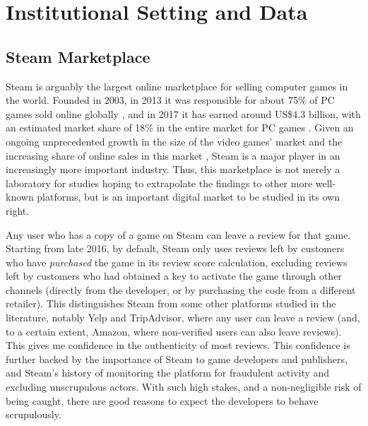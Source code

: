 \documentclass[12pt,pagebackref]{article}
\begin{document}
\hypertarget{institutional-setting-and-data}{%
\section{Institutional Setting and
Data}\label{institutional-setting-and-data}}

\hypertarget{steam-marketplace}{%
\subsection{Steam Marketplace}\label{steam-marketplace}}

Steam is arguably the largest online marketplace for selling computer
games in the world. Founded in 2003, in 2013 it was responsible for
about 75\% of PC games sold online globally \citep{steamBloomberg}, and
in 2017 it has earned around US\$4.3 billion, with an estimated market
share of 18\% in the entire market for PC games \citep{psgames}. Given
an ongoing unprecedented growth in the size of the video games' market
\citep[\$43.4 billion in 2018, about the size of the U.S. film
industry,][]{videoGamesMarket} and the increasing share of online sales
in this market \citep[83\% in 2018, compared to 20\% in
2009,][]{steamNPD}, Steam is a major player in an increasingly more
important industry. Thus, this marketplace is not merely a laboratory
for studies hoping to extrapolate the findings to other more well-known
platforms, but is an important digital market to be studied in its own
right.

Any user who has a copy of a game on Steam can leave a review for that
game. Starting from late 2016, by default, Steam only uses reviews left
by customers who have \emph{purchased} the game in its review score
calculation, excluding reviews left by customers who had obtained a key
to activate the game through other channels (directly from the
developer, or by purchasing the code from a different retailer). This
distinguishes Steam from some other platforms studied in the literature,
notably Yelp and TripAdvisor, where any user can leave a review (and, to
a certain extent, Amazon, where non-verified users can also leave
reviews). This gives me confidence in the authenticity of most reviews.
This confidence is further backed by the importance of Steam to game
developers and publishers, and Steam's history of monitoring the
platform for fraudulent activity and excluding unscrupulous actors. With
such high stakes, and a non-negligible risk of being caught, there are
good reasons to expect the developers to behave scrupulously.
\end{document}

